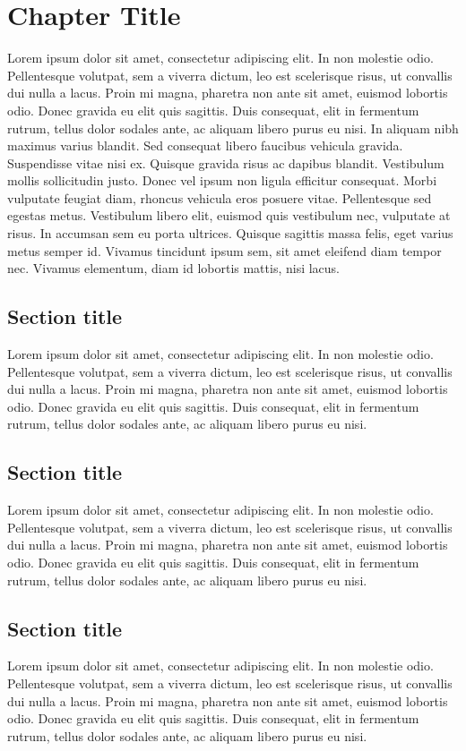 \documentclass[12pt]{report}
\begin{document}
\chapter{Chapter Title}

Lorem ipsum dolor sit amet, consectetur adipiscing elit. In non molestie odio. Pellentesque volutpat, sem a viverra dictum, leo est scelerisque risus, ut convallis dui nulla a lacus. Proin mi magna, pharetra non ante sit amet, euismod lobortis odio. Donec gravida eu elit quis sagittis. Duis consequat, elit in fermentum rutrum, tellus dolor sodales ante, ac aliquam libero purus eu nisi. In aliquam nibh maximus varius blandit. Sed consequat libero faucibus vehicula gravida. Suspendisse vitae nisi ex. Quisque gravida risus ac dapibus blandit. Vestibulum mollis sollicitudin justo. Donec vel ipsum non ligula efficitur consequat. Morbi vulputate feugiat diam, rhoncus vehicula eros posuere vitae. Pellentesque sed egestas metus. Vestibulum libero elit, euismod quis vestibulum nec, vulputate at risus. In accumsan sem eu porta ultrices. Quisque sagittis massa felis, eget varius metus semper id. Vivamus tincidunt ipsum sem, sit amet eleifend diam tempor nec. Vivamus elementum, diam id lobortis mattis, nisi lacus.

\section{Section title}
Lorem ipsum dolor sit amet, consectetur adipiscing elit. In non molestie odio. Pellentesque volutpat, sem a viverra dictum, leo est scelerisque risus, ut convallis dui nulla a lacus. Proin mi magna, pharetra non ante sit amet, euismod lobortis odio. Donec gravida eu elit quis sagittis. Duis consequat, elit in fermentum rutrum, tellus dolor sodales ante, ac aliquam libero purus eu nisi. 

\section{Section title}
Lorem ipsum dolor sit amet, consectetur adipiscing elit. In non molestie odio. Pellentesque volutpat, sem a viverra dictum, leo est scelerisque risus, ut convallis dui nulla a lacus. Proin mi magna, pharetra non ante sit amet, euismod lobortis odio. Donec gravida eu elit quis sagittis. Duis consequat, elit in fermentum rutrum, tellus dolor sodales ante, ac aliquam libero purus eu nisi. 

\section{Section title}
Lorem ipsum dolor sit amet, consectetur adipiscing elit. In non molestie odio. Pellentesque volutpat, sem a viverra dictum, leo est scelerisque risus, ut convallis dui nulla a lacus. Proin mi magna, pharetra non ante sit amet, euismod lobortis odio. Donec gravida eu elit quis sagittis. Duis consequat, elit in fermentum rutrum, tellus dolor sodales ante, ac aliquam libero purus eu nisi. 
\end{document}
